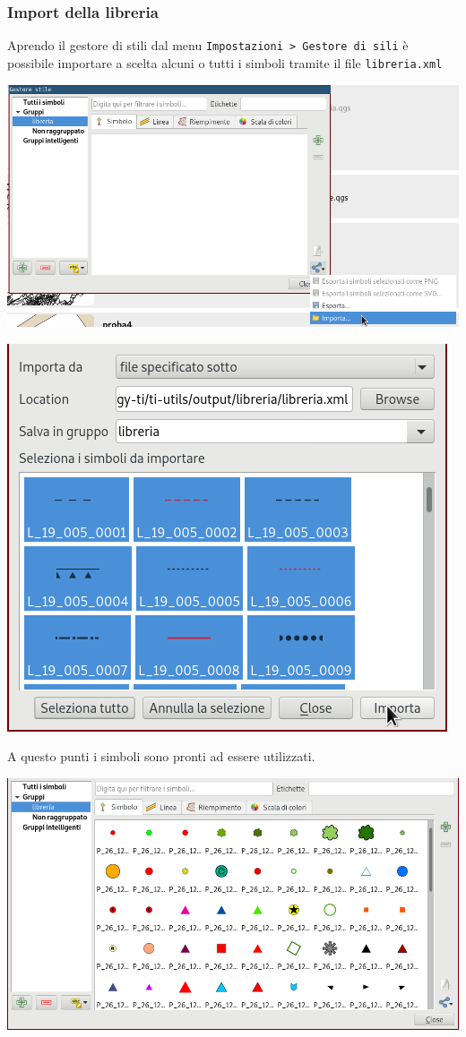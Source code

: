 \documentclass[11pt]{article}
\begin{document}
\subsubsection{Import della libreria}
\label{sec:org6c48548}
Aprendo il gestore di stili dal menu \texttt{Impostazioni > Gestore di sili} è
possibile importare a scelta alcuni o tutti i simboli tramite il file \texttt{libreria.xml}
\begin{center}
\includegraphics[width=.9\linewidth]{./import_xml.png}
\end{center}

\begin{center}
\includegraphics[width=.9\linewidth]{./import_symbols.png}
\end{center}
A questo punti i simboli sono pronti ad essere utilizzati.
\begin{center}
\includegraphics[width=.9\linewidth]{./imported_symbols.png}
\end{center}
\end{document}
